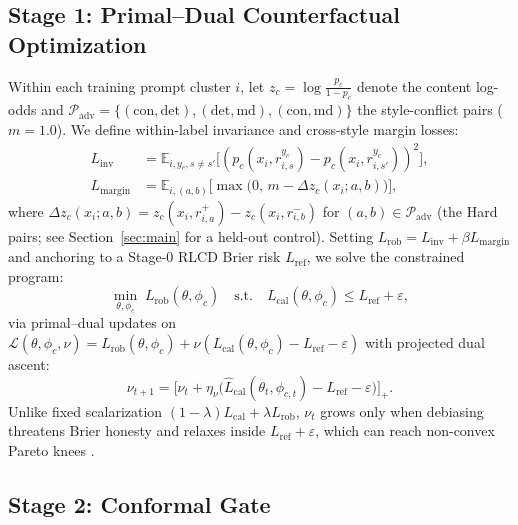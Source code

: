 \documentclass[letterpaper]{article} %
\begin{document}
\subsection{Stage 1: Primal--Dual Counterfactual Optimization}

Within each training prompt cluster $i$, let $z_c=\log\frac{p_c}{1-p_c}$ denote the content log-odds and $\mathcal{P}_{\mathrm{adv}}=\{(\mathrm{con},\mathrm{det}),(\mathrm{det},\mathrm{md}),(\mathrm{con},\mathrm{md})\}$ the style-conflict pairs ($m{=}1.0$). We define within-label invariance and cross-style margin losses:
\begin{align}
L_{\mathrm{inv}} &= \mathbb{E}_{i,y_c,s\neq s'}\!\bigl[(p_c(x_i,r^{y_c}_{i,s})-p_c(x_i,r^{y_c}_{i,s'}))^2\bigr], \label{eq:inv}\\
L_{\mathrm{margin}} &= \mathbb{E}_{i,(a,b)}\!\bigl[\max\bigl(0,\, m - \Delta z_c(x_i; a, b)\bigr)\bigr], \nonumber
\end{align}
where $\Delta z_c(x_i; a, b)=z_c(x_i,r^+_{i,a}) - z_c(x_i,r^-_{i,b})$ for $(a,b)\in\mathcal{P}_{\mathrm{adv}}$ (the Hard pairs; see Section~\ref{sec:main} for a held-out control). Setting $L_{\mathrm{rob}} = L_{\mathrm{inv}} + \beta L_{\mathrm{margin}}$ and anchoring to a Stage-0 RLCD Brier risk $L_{\mathrm{ref}}$, we solve the constrained program:
\begin{equation}
\min_{\theta,\phi_c}\; L_{\mathrm{rob}}(\theta,\phi_c)
\quad\text{s.t.}\quad
L_{\mathrm{cal}}(\theta,\phi_c) \le L_{\mathrm{ref}} + \varepsilon,
\label{eq:constrained}
\end{equation}
via primal--dual updates on $\mathcal{L}(\theta,\phi_c,\nu)=L_{\mathrm{rob}}(\theta,\phi_c) + \nu(L_{\mathrm{cal}}(\theta,\phi_c)-L_{\mathrm{ref}}-\varepsilon)$ with projected dual ascent:
\begin{equation}
\nu_{t+1} = \bigl[\nu_t + \eta_{\nu}\bigl(\widehat{L}_{\mathrm{cal}}(\theta_t,\phi_{c,t}) - L_{\mathrm{ref}} - \varepsilon\bigr)\bigr]_+.
\label{eq:dual}
\end{equation}
Unlike fixed scalarization $(1-\lambda)L_{\mathrm{cal}}+\lambda L_{\mathrm{rob}}$, $\nu_t$ grows only when debiasing threatens Brier honesty and relaxes inside $L_{\mathrm{ref}}+\varepsilon$, which can reach non-convex Pareto knees \citep{chamon2020probably}.

\subsection{Stage 2: Conformal Gate}
\end{document}
